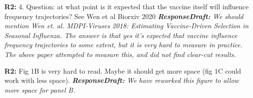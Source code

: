 \documentclass[aps,rmp,onecolumn]{revtex4-1}
\newcommand{\refb}[1]{\textbf{R2:} #1\vskip 5mm}
\newcommand{\responsedraft}[1]{{\it {\color{purple}\textbf{ResponseDraft:} #1}}}
\begin{document}
\refb{4. Question: at what point is it expected that the vaccine itself will influence frequency trajectories? See Wen et al Biorxiv 2020}
\responsedraft{We should mention Wen \emph{et. al.} MDPI-Viruses 2018: \emph{Estimating Vaccine-Driven Selection in Seasonal Influenza}. 
The answer is that yes it's expected that vaccine influence frequency trajectories to some extent, but it is very hard to measure in practice. 
The above paper attempted to measure this, and did not find clear-cut results.}

\refb{Fig 1B is very hard to read. Maybe it should get more space (fig 1C could work with less space).}
\responsedraft{We have reworked this figure to allow more space for panel B.}
\end{document}
